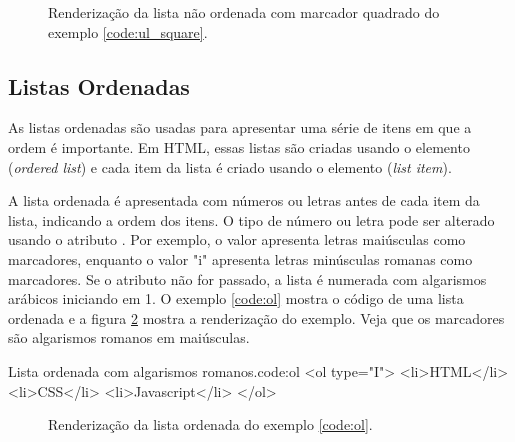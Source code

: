 \begin{figure}[ht!]    
    \caption{Renderização da lista não ordenada com marcador quadrado do exemplo \ref{code:ul_square}.}
    \label{fig:ul_square}
\end{figure}

\subsection{Listas Ordenadas}

As listas ordenadas são usadas para apresentar uma série de itens em que a ordem é importante. Em HTML, essas listas são criadas usando o elemento  (\textit{ordered list}) e cada item da lista é criado usando o elemento  (\textit{list item}).

A lista ordenada é apresentada com números ou letras antes de cada item da lista, indicando a ordem dos itens. O tipo de número ou letra pode ser alterado usando o atributo . Por exemplo, o valor  apresenta letras maiúsculas como marcadores, enquanto o valor "i" apresenta letras minúsculas romanas como marcadores. Se o atributo  não for passado, a lista é numerada com algarismos arábicos iniciando em 1. O exemplo \ref{code:ol} mostra o código de uma lista ordenada e a figura \ref{fig:ol} mostra a renderização do exemplo. Veja que os marcadores são algarismos romanos em maiúsculas.

\begin{htmlcode}{Lista ordenada com algarismos romanos.}{code:ol}
<ol type="I">
    <li>HTML</li>
    <li>CSS</li>
    <li>Javascript</li>
</ol>
\end{htmlcode}

\begin{figure}[ht!]    
    \caption{Renderização da lista ordenada do exemplo \ref{code:ol}.}
    \label{fig:ol}
\end{figure}

